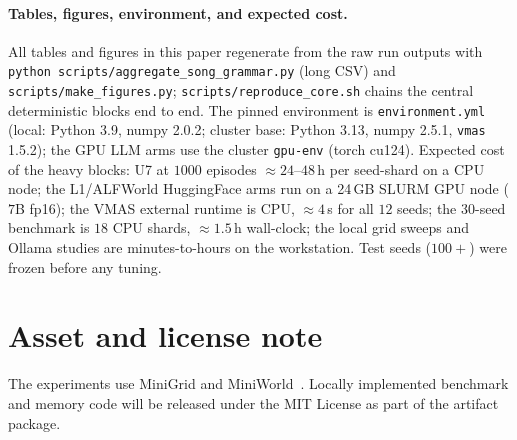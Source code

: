 \documentclass{article}
\begin{document}
\paragraph{Tables, figures, environment, and expected cost.} All
tables and figures in this paper regenerate from the raw run outputs
with \texttt{python scripts/aggregate\_song\_grammar.py} (long CSV) and
\texttt{scripts/make\_figures.py}; \texttt{scripts/reproduce\_core.sh}
chains the central deterministic blocks end to end. The pinned
environment is \texttt{environment.yml} (local: Python 3.9, numpy
2.0.2; cluster base: Python 3.13, numpy 2.5.1, \texttt{vmas} 1.5.2);
the GPU LLM arms use the cluster \texttt{gpu-env} (torch cu124).
Expected cost of the heavy blocks: U7 at $1000$ episodes
$\approx 24$--$48$\,h per seed-shard on a CPU node; the L1/ALFWorld
HuggingFace arms run on a 24\,GB SLURM GPU node ($7$B fp16); the VMAS
external runtime is CPU, ${\approx}4$\,s for all $12$ seeds; the
30-seed benchmark is $18$ CPU shards, ${\approx}1.5$\,h wall-clock;
the local grid sweeps and Ollama studies are minutes-to-hours on the
workstation. Test seeds ($100{+}$) were frozen before any tuning.
\FloatBarrier


\section{Asset and license note}
\label{p4:app:assets}

The experiments use MiniGrid and MiniWorld~\citep{MinigridMiniworld23}. Locally implemented benchmark and memory code will be released under the MIT License as part of the artifact package.

\clearpage
\FloatBarrier
\FloatBarrier

\clearpage
\end{document}
